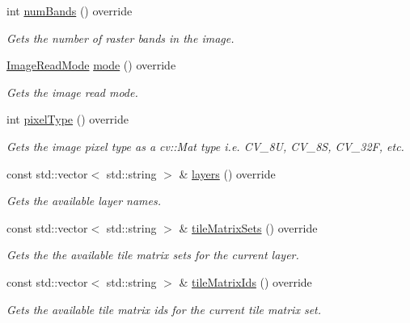 \begin{DoxyCompactItemize}
int \hyperlink{classdg_1_1deepcore_1_1imagery_1_1_wmts_client_a2f01504ae2c8c65783e2878e1525fb65}{num\+Bands} () override
\begin{DoxyCompactList}\small\item\em Gets the number of raster bands in the image. \end{DoxyCompactList}\item 
\hyperlink{group___imagery_module_ga1db94ae833853b71ed501bb1ea8c1c24}{Image\+Read\+Mode} \hyperlink{classdg_1_1deepcore_1_1imagery_1_1_wmts_client_a011ce59444a970647066f9edf3a7544b}{mode} () override
\begin{DoxyCompactList}\small\item\em Gets the image read mode. \end{DoxyCompactList}\item 
int \hyperlink{classdg_1_1deepcore_1_1imagery_1_1_wmts_client_aa37e7de3375cc1d6027d11bec347375a}{pixel\+Type} () override
\begin{DoxyCompactList}\small\item\em Gets the image pixel type as a cv\+::\+Mat type i.\+e. C\+V\+\_\+8U, C\+V\+\_\+8S, C\+V\+\_\+32F, etc. \end{DoxyCompactList}\item 
const std\+::vector$<$ std\+::string $>$ \& \hyperlink{classdg_1_1deepcore_1_1imagery_1_1_wmts_client_aadea619994a1fba8c8ed51894381a234}{layers} () override
\begin{DoxyCompactList}\small\item\em Gets the available layer names. \end{DoxyCompactList}\item 
const std\+::vector$<$ std\+::string $>$ \& \hyperlink{classdg_1_1deepcore_1_1imagery_1_1_wmts_client_aaeb1a41ceda072c0f11b33bdd3cf819e}{tile\+Matrix\+Sets} () override
\begin{DoxyCompactList}\small\item\em Gets the the available tile matrix sets for the current layer. \end{DoxyCompactList}\item 
const std\+::vector$<$ std\+::string $>$ \& \hyperlink{classdg_1_1deepcore_1_1imagery_1_1_wmts_client_ab71e17f8fd1c50c2aa64171c7e4c5f8a}{tile\+Matrix\+Ids} () override
\begin{DoxyCompactList}\small\item\em Gets the available tile matrix ids for the current tile matrix set. \end{DoxyCompactList}\item 

\end{DoxyCompactItemize}
